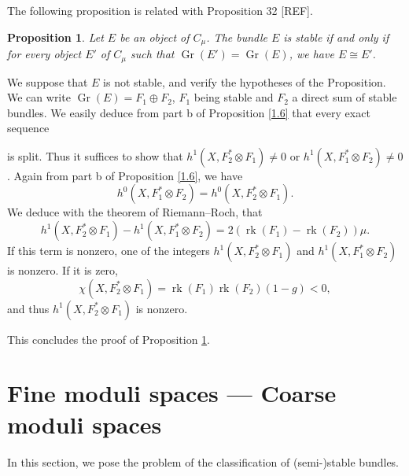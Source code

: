 \documentclass[12pt,a4paper]{book}
\DeclareMathOperator\rk{rk}
\DeclareMathOperator\Gr{Gr}
\newtheorem{prop}[thm]{Proposition}
\theoremstyle{definition} \newtheorem{defn}[thm]{Definition}
\theoremstyle{definition} \newtheorem{ejs}[thm]{Examples}
\theoremstyle{definition} \newtheorem{ej}[thm]{Example}
\begin{document}
      The following proposition is related with Proposition 32 [REF].

      \begin{prop}\label{1.11}
	Let $E$ be an object of $C_\mu$. The bundle $E$ is stable if and only if for every object $E'$ of $C_\mu$ such that $\Gr(E')=\Gr(E)$, we have $E\cong E'$.
      \end{prop}

      We suppose that $E$ is not stable, and verify the hypotheses of the Proposition. We can write $\Gr(E)=F_1 \oplus F_2$, $F_1$ being stable and $F_2$ a direct sum of stable bundles. We easily deduce from part b of Proposition \ref{1.6} that every exact sequence
      \begin{center}
      \end{center}
      \begin{center}
      \end{center}
      is split. Thus it suffices to show that $h^1(X,F_2^* \otimes F_1) \neq 0$ or $h^1(X,F_1^* \otimes F_2) \neq 0$. Again from part b of Proposition \ref{1.6}, we have
      \begin{equation*}
	h^0(X,F_1^* \otimes F_2)= h^0(X,F_2^* \otimes F_1).
      \end{equation*}
      We deduce with the theorem of Riemann--Roch, that
      \begin{equation*}
	h^1(X,F_2^* \otimes F_1) - h^1(X,F_1^* \otimes F_2) = 2(\rk(F_1) - \rk(F_2)) \mu.
      \end{equation*}
      If this term is nonzero, one of the integers $h^1(X,F_2^* \otimes F_1)$ and $h^1(X,F_1^*\otimes F_2)$ is nonzero. If it is zero,
      \begin{equation*}
	\chi(X,F_2^* \otimes F_1) = \rk(F_1)\rk(F_2)(1-g) < 0,
      \end{equation*}
      and thus $h^1(X,F_2^* \otimes F_1)$ is nonzero.

      This concludes the proof of Proposition \ref{1.11}. 

      \section{Fine moduli spaces --- Coarse moduli spaces} \label{section 1II}
      In this section, we pose the problem of the classification of (semi-)stable bundles.
\end{document}
